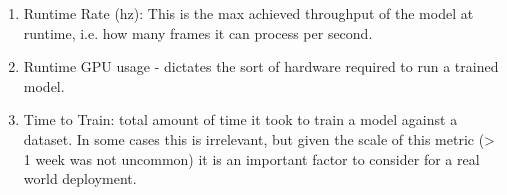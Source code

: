 \begin{enumerate}
  \item Runtime Rate (hz): This is the max achieved throughput of the model at runtime, i.e. how many frames it can process per second.
  \item Runtime GPU usage - dictates the sort of hardware required to run a trained model.
  \item Time to Train: total amount of time it took to train a model against a dataset. In some cases this is irrelevant, but given the scale of this metric (> 1 week was not uncommon) it is an important factor to consider for a real world deployment.
\end{enumerate}

